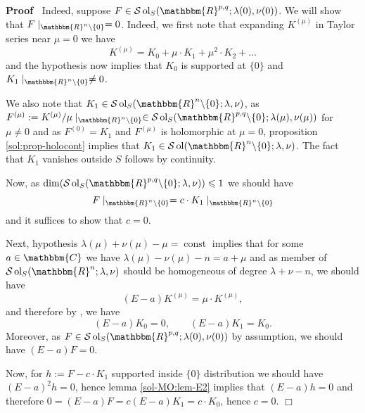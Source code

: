 \documentclass[12pt]{article}
\newcommand{\assign}{:=}
\newcommand{\tmop}[1]{\ensuremath{\operatorname{#1}}}
\renewenvironment{proof}{\noindent\textbf{Proof\ }}{\hspace*{\fill}$\Box$\medskip}
\theoremstyle{remark}
\begin{document}
\begin{proof}
  Indeed, suppose $F \in \mathcal{S} \tmop{ol}_S (\mathbbm{R}^{p, q} ; \lambda
  (0), \nu (0))$. We will show that $F \mid_{\mathbbm{R}^n \backslash \{ 0
  \}} = 0$. Indeed, we first note that expanding $K^{(\mu)}$ in Taylor
  series near $\mu = 0$ we have
  \[ K^{(\mu)} = K_0 + \mu \cdot K_1 + \mu^2 \cdot K_2 + \ldots \]
  and the hypothesis now implies that $K_0$ is supported at $\{ 0 \}$ and $K_1
  \mid_{\mathbbm{R}^n \backslash \{ 0 \}} \neq 0$.
  
  We also note that $K_1 \in \mathcal{S} \tmop{ol}_S (\mathbbm{R}^n
  \backslash \{ 0 \} ; \lambda, \nu)$, as $F^{(\mu)} \assign K^{(\mu)} / \mu
  \mid_{\mathbbm{R}^n \backslash \{ 0 \}} \in \mathcal{S} \tmop{ol}_S
  (\mathbbm{R}^{p, q} \backslash \{ 0 \} ; \lambda (\mu), \nu (\mu))$ for $\mu
  \neq 0$ and as $F^{(0)} = K_1$ and $F^{(\mu)}$ is holomorphic at $\mu = 0$,
  proposition \ref{sol:prop-holocont} implies that $K_1 \in \mathcal{S}
  \tmop{ol} (\mathbbm{R}^n \backslash \{ 0 \} ; \lambda, \nu)$. The fact
  that $K_1$ vanishes outside $S$ follows by continuity.
  
  Now, as $\dim (\mathcal{S} \tmop{ol}_S (\mathbbm{R}^{p, q} \backslash \{ 0
  \} ; \lambda, \nu)) \leqslant 1$ we should have
  \[ F \mid_{\mathbbm{R}^n \backslash \{ 0 \}} = c \cdot K_1
     \mid_{\mathbbm{R}^n \backslash \{ 0 \}} \]
  and it suffices to show that $c = 0$.
  
  Next, hypothesis $\lambda (\mu) + \nu (\mu) - \mu = \tmop{const}$ implies
  that for some $a \in \mathbbm{C}$ we have $\lambda (\mu) - \nu (\mu) - n = a
  + \mu$ and as member of $\mathcal{S} \tmop{ol}_S (\mathbbm{R}^n ; \lambda,
  \nu)$ should be homogeneous of degree $\lambda + \nu - n$, we should have
  \[ (E - a) K^{(\mu)} = \mu \cdot K^{(\mu)}, \]
  and therefore by {\cite[lem. 11.10]{kobayashi2015symmetry}}, we have
  \[ (E - a) K_0 = 0, \qquad (E - a) K_1 = K_0 . \]
  Moreover, as $F \in \mathcal{S} \tmop{ol}_S (\mathbbm{R}^{p, q} ; \lambda
  (0), \nu (0))$ by assumption, we should have $(E - a) F = 0$.
  
  Now, for $h \assign F - c \cdot K_1$ supported inside $\{ 0 \}$ distribution
  we should have $(E - a)^2 h = 0$, hence lemma \ref{sol-MO:lem-E2} implies
  that $(E - a) h = 0$ and therefore $0 = (E - a) F = c (E - a) K_1 = c \cdot
  K_0$, hence $c = 0$.
\end{proof}
\end{document}
